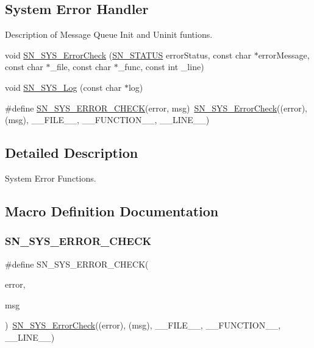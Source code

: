 \subsection*{System Error Handler}
\label{_amgrpa5a8766d725e75a210751450a529e0a3}%
Description of Message Queue Init and Uninit funtions. \begin{DoxyCompactItemize}
\item 
void \hyperlink{group__SYSTEM__ERROR_ga0a87cb464a83646bf30c20c867754a02}{S\+N\+\_\+\+S\+Y\+S\+\_\+\+Error\+Check} (\hyperlink{group__SYSTEM__ERROR_ga4540713b9a7a18ce44d78c3a10f7442f}{S\+N\+\_\+\+S\+T\+A\+T\+US} error\+Status, const char $\ast$error\+Message, const char $\ast$\+\_\+file, const char $\ast$\+\_\+func, const int \+\_\+line)
\item 
void \hyperlink{group__SYSTEM__ERROR_gaacf422ec9176edcc5b0d803da0b567b7}{S\+N\+\_\+\+S\+Y\+S\+\_\+\+Log} (const char $\ast$log)
\item 
\#define \hyperlink{group__SYSTEM__ERROR_gaaa32db6b360e68cd1d2a84f7ac1992cd}{S\+N\+\_\+\+S\+Y\+S\+\_\+\+E\+R\+R\+O\+R\+\_\+\+C\+H\+E\+CK}(error,  msg)~\hyperlink{group__SYSTEM__ERROR_ga0a87cb464a83646bf30c20c867754a02}{S\+N\+\_\+\+S\+Y\+S\+\_\+\+Error\+Check}((error), (msg), \+\_\+\+\_\+\+F\+I\+L\+E\+\_\+\+\_\+, \+\_\+\+\_\+\+F\+U\+N\+C\+T\+I\+O\+N\+\_\+\+\_\+, \+\_\+\+\_\+\+L\+I\+N\+E\+\_\+\+\_\+)
\end{DoxyCompactItemize}


\subsection{Detailed Description}
System Error Functions. 



\subsection{Macro Definition Documentation}
\mbox{\label{group__SYSTEM__ERROR_gaaa32db6b360e68cd1d2a84f7ac1992cd}} 
\subsubsection{\texorpdfstring{S\+N\+\_\+\+S\+Y\+S\+\_\+\+E\+R\+R\+O\+R\+\_\+\+C\+H\+E\+CK}{SN\_SYS\_ERROR\_CHECK}}
{\footnotesize\ttfamily \#define S\+N\+\_\+\+S\+Y\+S\+\_\+\+E\+R\+R\+O\+R\+\_\+\+C\+H\+E\+CK(\begin{DoxyParamCaption}\item[{}]{error,  }\item[{}]{msg }\end{DoxyParamCaption})~\hyperlink{group__SYSTEM__ERROR_ga0a87cb464a83646bf30c20c867754a02}{S\+N\+\_\+\+S\+Y\+S\+\_\+\+Error\+Check}((error), (msg), \+\_\+\+\_\+\+F\+I\+L\+E\+\_\+\+\_\+, \+\_\+\+\_\+\+F\+U\+N\+C\+T\+I\+O\+N\+\_\+\+\_\+, \+\_\+\+\_\+\+L\+I\+N\+E\+\_\+\+\_\+)}




